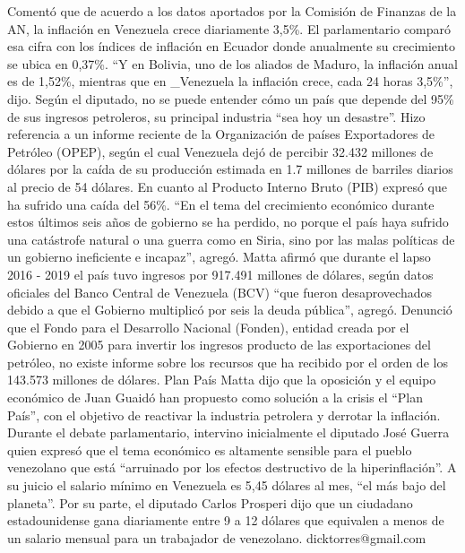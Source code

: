 \documentclass{article}%
\begin{document}
\newline%
%
Comentó que de acuerdo a los datos aportados por la Comisión de Finanzas de la AN, la inflación en Venezuela crece diariamente 3,5\%.%
\newline%
%
El parlamentario comparó esa cifra con los índices de inflación en Ecuador donde anualmente su crecimiento se ubica en 0,37\%.%
\newline%
%
“Y en Bolivia, uno de los aliados de Maduro, la inflación anual es de 1,52\%, mientras que en \_Venezuela la inflación crece, cada 24 horas 3,5\%”, dijo.%
\newline%
%
Según el diputado, no se puede entender cómo un país que depende del 95\% de sus ingresos petroleros, su principal industria “sea hoy un desastre”.%
\newline%
%
Hizo referencia a un informe reciente de la Organización de países Exportadores de Petróleo (OPEP), según el cual Venezuela dejó de percibir 32.432 millones de dólares por la caída de su producción estimada en 1.7 millones de barriles diarios al precio de 54 dólares.%
\newline%
%
En cuanto al Producto Interno Bruto (PIB) expresó que ha sufrido una caída del 56\%.%
\newline%
%
“En el tema del crecimiento económico durante estos últimos seis años de gobierno se ha perdido, no porque el país haya sufrido una catástrofe natural o una guerra como en Siria, sino por las malas políticas de un gobierno ineficiente e incapaz”, agregó.%
\newline%
%
Matta afirmó que durante el lapso 2016 {-} 2019 el país tuvo ingresos por 917.491 millones de dólares, según datos oficiales del Banco Central de Venezuela (BCV) “que fueron desaprovechados debido a que el Gobierno multiplicó por seis la deuda pública”, agregó.%
\newline%
%
Denunció que el Fondo para el Desarrollo Nacional (Fonden), entidad creada por el Gobierno en 2005 para invertir los ingresos producto de las exportaciones del petróleo, no existe informe sobre los recursos que ha recibido por el orden de los 143.573 millones de dólares.%
\newline%
%
Plan País%
\newline%
%
Matta dijo que la oposición y el equipo económico de Juan Guaidó han propuesto como solución a la crisis el “Plan País”, con el objetivo de reactivar la industria petrolera y derrotar la inflación.%
\newline%
%
Durante el debate parlamentario, intervino inicialmente el diputado José Guerra quien expresó que  el tema económico es altamente sensible para el pueblo venezolano que está “arruinado por los efectos destructivo de la hiperinflación”.%
\newline%
%
A su juicio el salario mínimo en Venezuela es 5,45 dólares al mes, “el más bajo del planeta”.%
\newline%
%
Por su parte, el diputado Carlos Prosperi dijo que un ciudadano estadounidense gana diariamente entre 9 a 12 dólares que equivalen a menos de un salario mensual para un trabajador de venezolano.%
\newline%
%
dicktorres@gmail.com%
\newline%
%
\end{document}
